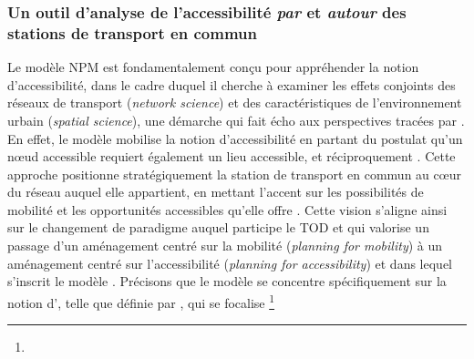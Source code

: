\begin{refsegment}
\subsubsection*{Un outil d'analyse de l'accessibilité \textsl{par} et \textsl{autour} des stations de transport en commun
    \label{chap6:litterature-concept-accessibilite}
    }

Le modèle \acrshort{NPM} est fondamentalement conçu pour appréhender la notion d'accessibilité, dans le cadre duquel il cherche à examiner les effets conjoints des réseaux de transport (\textsl{network science}) et des caractéristiques de l'environnement urbain (\textsl{spatial science}), une démarche qui fait écho aux perspectives tracées par \textcolor{blue}{\textcite[300]{ducruet_spatial_2014}}. En effet, le modèle mobilise la notion d'accessibilité en partant du postulat qu'un nœud accessible requiert également un lieu accessible, et réciproquement \textcolor{blue}{\autocite[203]{bertolini_spatial_1999}}. Cette approche positionne stratégiquement la station de transport en commun au cœur du réseau auquel elle appartient, en mettant l'accent sur les possibilités de mobilité et les opportunités accessibles qu'elle offre \textcolor{blue}{\autocite[3]{amini_pishro_node_2022}}. Cette vision s'aligne ainsi sur le changement de paradigme auquel participe le \acrshort{TOD} \textcolor{blue}{\autocite[75]{banister_sustainable_2008}} et qui valorise un passage d'un aménagement centré sur la mobilité (\textsl{planning for mobility}) à un aménagement centré sur l'accessibilité (\textsl{planning for accessibility}) et dans lequel s'inscrit le modèle \textcolor{blue}{\autocite[496]{caset_measuring_2018}}. Précisons que le modèle se concentre spécifiquement sur la notion d', telle que définie par \textcolor{blue}{\textcite[27]{dalvi_measurement_1976}}, qui se focalise \footnote{
}
\end{refsegment}
